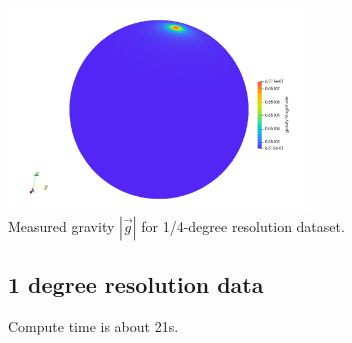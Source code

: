 \begin{center}
\includegraphics[width=8cm]{python_codes/fieldstone_100/results/quarter/gravshell}\\
{\captionfont Measured gravity $|\vec{g}|$ for 1/4-degree resolution dataset.}
\end{center}






\newpage
\subsection*{1 degree resolution data}

Compute time is about 21s. 

